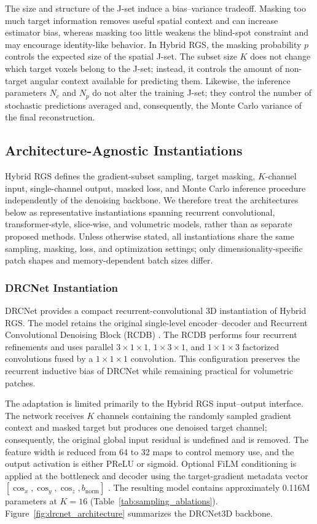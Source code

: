 \documentclass[preprint,12pt]{elsarticle}
\begin{document}
The size and structure of the J-set induce a bias--variance tradeoff. Masking too much target information removes useful spatial context and can increase estimator bias, whereas masking too little weakens the blind-spot constraint and may encourage identity-like behavior. In Hybrid RGS, the masking probability $p$ controls the expected size of the spatial J-set. The subset size $K$ does not change which target voxels belong to the J-set; instead, it controls the amount of non-target angular context available for predicting them. Likewise, the inference parameters $N_c$ and $N_p$ do not alter the training J-set; they control the number of stochastic predictions averaged and, consequently, the Monte Carlo variance of the final reconstruction.

\subsection{Architecture-Agnostic Instantiations}
\label{subsec:architectures}
Hybrid RGS defines the gradient-subset sampling, target masking, $K$-channel input, single-channel output, masked loss, and Monte Carlo inference procedure independently of the denoising backbone. We therefore treat the architectures below as representative instantiations spanning recurrent convolutional, transformer-style, slice-wise, and volumetric models, rather than as separate proposed methods. Unless otherwise stated, all instantiations share the same sampling, masking, loss, and optimization settings; only dimensionality-specific patch shapes and memory-dependent batch sizes differ.

\subsubsection{DRCNet Instantiation}
DRCNet provides a compact recurrent-convolutional 3D instantiation of Hybrid RGS. The model retains the original single-level encoder--decoder and Recurrent Convolutional Denoising Block (RCDB) \cite{gurrola2024drcnet}. The RCDB performs four recurrent refinements and uses parallel $3\times1\times1$, $1\times3\times1$, and $1\times1\times3$ factorized convolutions fused by a $1\times1\times1$ convolution. This configuration preserves the recurrent inductive bias of DRCNet while remaining practical for volumetric patches.

The adaptation is limited primarily to the Hybrid RGS input--output interface. The network receives $K$ channels containing the randomly sampled gradient context and masked target but produces one denoised target channel; consequently, the original global input residual is undefined and is removed. The feature width is reduced from 64 to 32 maps to control memory use, and the output activation is either PReLU or sigmoid. Optional FiLM conditioning is applied at the bottleneck and decoder using the target-gradient metadata vector $[\cos_x,\cos_y,\cos_z,b_{\mathrm{norm}}]$ \cite{perez2018film}. The resulting model contains approximately 0.116M parameters at $K=16$ (Table~\ref{tab:sampling_ablations}). Figure~\ref{fig:drcnet_architecture} summarizes the DRCNet3D backbone.
\end{document}
